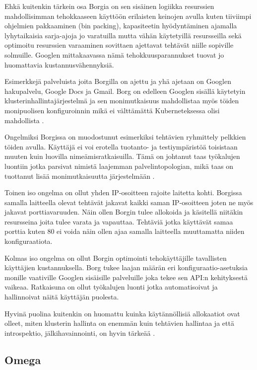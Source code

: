 \documentclass[finnish,gradu]{tktltiki3}
\begin{document}
    Ehkä kuitenkin tärkein osa Borgia on sen sisäinen logiikka resurssien mahdollisimman tehokkaaseen käyttöön erilaisten keinojen avulla kuten tiiviimpi ohjelmien pakkaaminen (bin packing), kapasiteetin hyödyntäminen ajamalla lyhytaikaisia sarja-ajoja jo varatuilla mutta vähän käytetyillä resursseilla sekä optimoitu resurssien varaaminen sovittaen ajettavat tehtävät niille sopiville solmuille. Googlen mittakaavassa nämä tehokkuusparannukset tuovat jo huomattavia kustannusvähennyksiä.
    
    Esimerkkejä palveluista joita Borgilla on ajettu ja yhä ajetaan on Googlen hakupalvelu, Google Docs ja Gmail. Borg on edelleen Googlen sisällä käytetyin klusterinhallintajärjestelmä ja sen monimutkaisuus mahdollistaa myös töiden monipuolisen konfiguroinnin mikä ei välttämättä Kuberneteksessa olisi mahdollista \cite{management-with-borg}.
    
    Ongelmiksi Borgissa on muodostunut esimerkiksi tehtävien ryhmittely pelkkien töiden avulla. Käyttäjä ei voi erotella tuotanto- ja testiympäristöä toisistaan muuten kuin luovilla nimeämisratkaisuilla. Tämä on johtanut taas työkalujen luontiin jotka parsivat nimistä laajemman palvelintopologian, mikä taas on tuottanut lisää monimutkaisuutta järjestelmään \cite{borg-goto-youtube}.
    
    Toinen iso ongelma on ollut yhden IP-osoitteen rajoite laitetta kohti. Borgissa samalla laitteella olevat tehtävät jakavat kaikki saman IP-osoitteen joten ne myös jakavat porttiavaruuden. Näin ollen Borgin tulee allokoida ja käsitellä niitäkin resursseina joita tulee varata ja vapauttaa. Tehtäviä jotka käyttävät samaa porttia kuten 80 ei voida näin ollen ajaa samalla laitteella muuttamatta niiden konfiguraatiota.
    
    Kolmas iso ongelma on ollut Borgin optimointi tehokäyttäjille tavallisten käyttäjien kustannuksella. Borg tukee laajan määrän eri konfiguraatio-asetuksia monille vaativille Googlen sisäisille palveluille joka tekee sen API:n kehityksestä vaikeaa. Ratkaisuna on ollut työkalujen luonti jotka automatisoivat ja hallinnoivat näitä käyttäjän puolesta.
    
    Hyvinä puolina kuitenkin on huomattu kuinka käytännöllisiä allokaatiot ovat olleet, miten klusterin hallinta on enemmän kuin tehtävien hallintaa ja että introspektio, jälkihavainnointi, on hyvin tärkeää \cite{management-with-borg}.
    
    \subsection{Omega}
    
\end{document}
